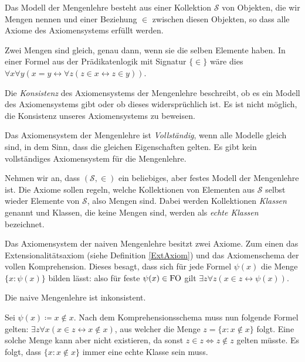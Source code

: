 Das Modell der Mengenlehre besteht aus einer Kollektion $\mathcal{S}$ von Objekten, die wir Mengen nennen und einer Beziehung $\in$ zwischen diesen Objekten, so dass alle Axiome des Axiomensystems erfüllt werden.

\begin{definition}
	Zwei Mengen sind gleich, genau dann, wenn sie die selben Elemente haben. In einer Formel aus der Prädikatenlogik mit Signatur $\{\in\}$ wäre dies $\forall x \forall y (x=y \leftrightarrow \forall z (z \in x \leftrightarrow z \in y))$.
	\label{ExtAxiom}
\end{definition}

\begin{definition}[Konsistenz]
	Die \textit{Konsistenz} des Axiomensystems der Mengenlehre beschreibt, ob es ein Modell des Axiomensystems gibt oder ob dieses widersprüchlich ist. Es ist nicht möglich, die Konsistenz unseres Axiomensystems zu beweisen.
\end{definition}

\begin{definition}[Vollständigkeit]
	Das Axiomensystem der Mengenlehre ist \textit{Vollständig}, wenn alle Modelle \glqq gleich \grqq{} sind, in dem Sinn, dass die gleichen Eigenschaften gelten. Es gibt kein vollständiges Axiomensystem für die Mengenlehre.	
\end{definition}

Nehmen wir an, dass $(\mathcal{S},\in)$ ein beliebiges, aber festes Modell der Mengenlehre ist. Die Axiome sollen regeln, welche Kollektionen von Elementen aus $\mathcal{S}$ selbst wieder Elemente von $\mathcal{S}$, also Mengen sind. Dabei werden Kollektionen \textit{Klassen} genannt und Klassen, die keine Mengen sind, werden als \textit{echte Klassen} bezeichnet.

\begin{definition}
	Das Axiomensystem der naiven Mengenlehre besitzt zwei Axiome. Zum einen das Extensionalitätsaxiom (siehe Definition \ref{ExtAxiom}) und das Axiomenschema der vollen Komprehension. Dieses besagt, dass sich für jede Formel $\psi(x)$ die Menge $\{x : \psi(x)\}$ bilden lässt: also für feste $\psi(x)\in \operatorname{FO}$ gilt $\exists z \forall z(x \in z \leftrightarrow \psi(x))$.
\end{definition}

\begin{satz}
	Die naive Mengenlehre ist inkonsistent.
	
	Sei $\psi(x)\coloneqq x\notin x$. Nach dem Komprehensionsschema muss nun folgende Formel gelten: $\exists z \forall x(x\in z \leftrightarrow x\notin x)$, aus welcher die Menge $z=\{x : x\notin x\}$ folgt. Eine solche Menge kann aber nicht existieren, da sonst $z\in z \Leftrightarrow z \notin z$ gelten müsste. Es folgt, dass $\{x:x\notin x\}$ immer eine echte Klasse sein muss.
\end{satz}

